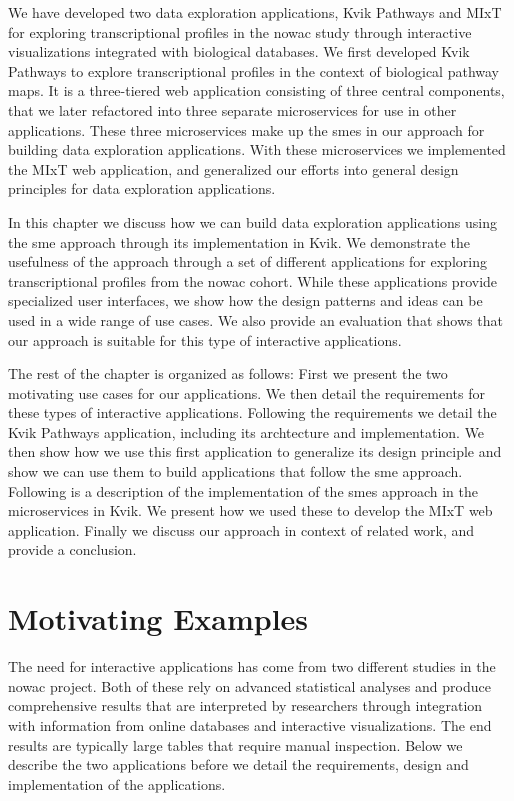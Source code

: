 We have developed two data exploration applications, Kvik
Pathways\cite{fjukstad2015kvik} and
MIxT\cite{fjukstad2017building,dumeaux2017interactions} for exploring
transcriptional profiles in the \gls{nowac} study through interactive
visualizations integrated with biological databases. We first developed Kvik
Pathways to explore transcriptional profiles in the context of biological
pathway maps. It is a three-tiered web application consisting of three central
components, that we later refactored into three separate microservices for use
in other applications. These three microservices make up the \glspl{sme} in our
approach for building data exploration applications.  With these microservices
we implemented the MIxT web application, and generalized our efforts into
general design principles for data exploration applications. 

In this chapter we discuss how we can build data exploration applications using
the \gls{sme} approach through its implementation in Kvik. We demonstrate the
usefulness of the approach through a set of different applications for exploring
transcriptional profiles from the \gls{nowac} cohort. While these applications
provide specialized user interfaces, we show how the design patterns and ideas
can be used in a wide range of use cases. We also provide an evaluation that
shows that our approach is suitable for this type of interactive applications. 

The rest of the chapter is organized as follows: First we present the two
motivating use cases for our applications. We then detail the requirements for
these types of interactive applications. Following the requirements we detail
the Kvik Pathways application, including its archtecture and implementation. We
then show how we use this first application to generalize its design principle
and show we can use them to build applications that follow the \gls{sme}
approach. Following is a description of the implementation of the \glspl{sme}
approach in the microservices in Kvik. We present how we used these to develop
the MIxT web application. Finally we discuss our approach in context of related
work, and provide a conclusion. 


\section{Motivating Examples}
The need for interactive applications has come from two different studies
in the \gls{nowac} project. Both of these rely on advanced statistical
analyses and produce comprehensive results that are interpreted by researchers
through integration with information from online databases and interactive
visualizations. The end results are typically large tables that require manual
inspection. Below we describe the two applications before we detail the
requirements, design and implementation of the applications. 

